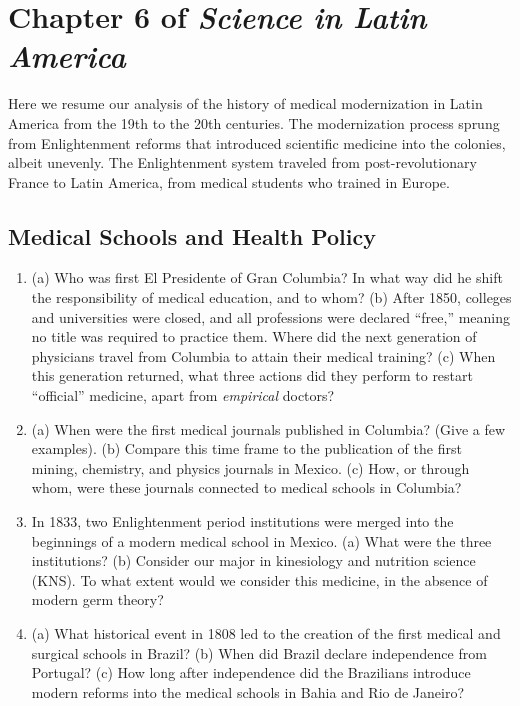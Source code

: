 \documentclass[12pt]{article}
\begin{document}
\maketitle
\small

\section{Chapter 6 of \textit{Science in Latin America}}

Here we resume our analysis of the history of medical modernization in Latin America from the 19th to the 20th centuries.  The modernization process sprung from Enlightenment reforms that introduced scientific medicine into the colonies, albeit unevenly.  The Enlightenment system traveled from post-revolutionary France to Latin America, from medical students who trained in Europe.

\subsection{Medical Schools and Health Policy}

\begin{enumerate}
\item (a) Who was first El Presidente of Gran Columbia?  In what way did he shift the responsibility of medical education, and to whom? (b) After 1850, colleges and universities were closed, and all professions were declared ``free,'' meaning no title was required to practice them.  Where did the next generation of physicians travel from Columbia to attain their medical training? (c) When this generation returned, what three actions did they perform to restart ``official'' medicine, apart from \textit{empirical} doctors? \\ \vspace{2cm}
\item (a) When were the first medical journals published in Columbia?  (Give a few examples).  (b) Compare this time frame to the publication of the first mining, chemistry, and physics journals in Mexico. (c) How, or through whom, were these journals connected to medical schools in Columbia? \\ \vspace{2cm}
\item In 1833, two Enlightenment period institutions were merged into the beginnings of a modern medical school in Mexico.  (a) What were the three institutions? (b) Consider our major in kinesiology and nutrition science (KNS).  To what extent would we consider this medicine, in the absence of modern germ theory? \\ \vspace{1cm}
\item (a) What historical event in 1808 led to the creation of the first medical and surgical schools in Brazil? (b) When did Brazil declare independence from Portugal? (c) How long after independence did the Brazilians introduce modern reforms into the medical schools in Bahia and Rio de Janeiro? \\ \vspace{1cm}
\end{enumerate}
\end{document}
